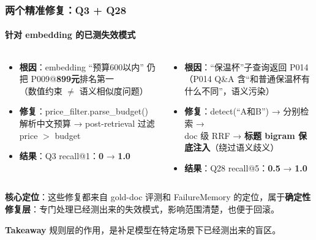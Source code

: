 \documentclass[aspectratio=169,10pt]{beamer}
\newcommand{\takeaway}[1]{%
  \vfill%
  \begin{tcolorbox}[
    colback=Ctakebg, colframe=Ctakebg,
    arc=0pt, boxrule=0pt,
    left=7pt, right=7pt, top=4pt, bottom=4pt,
    width=\textwidth, nobeforeafter
  ]%
    {\scriptsize\color{white}\textbf{Takeaway}\enspace%
     \color{white!88!Ctakebg}#1}%
  \end{tcolorbox}%
}
\newcommand{\hi}[1]{{\bfseries\color{Cgreen}#1}}      %
\newcommand{\bad}[1]{{\bfseries\color{Cred}#1}}       %
\newcommand{\mono}[1]{{\ttfamily\small\color{Cblue!90!black}#1}}  %
\begin{document}
\begin{frame}
\frametitle{两个精准修复：Q3 + Q28}
\framesubtitle{针对 embedding 的已测失效模式}

\begin{columns}[T]
\begin{tcolorbox}[tcblue, title={\color{Cblue}Q3 — 价格约束过滤}]
\small\begin{itemize}\setlength\itemsep{0.35em}
  \item \textbf{根因}：embedding ``预算600以内'' 仍把
    P009@\bad{899元}排名第一\\
    {\color{Cmuted}（数值约束 $\neq$ 语义相似度问题）}
  \item \textbf{修复}：\mono{price\_filter.parse\_budget()}\\
    解析中文预算 → post-retrieval 过滤 price $>$ budget
  \item \textbf{结果}：Q3 recall@1：\bad{0} → \hi{\textbf{1.0}}
\end{itemize}
\end{tcolorbox}

\begin{tcolorbox}[tcgreen, title={\color{Cgreen}Q28 — 复合查询分解}]
\small\begin{itemize}\setlength\itemsep{0.35em}
  \item \textbf{根因}：``保温杯''子查询返回 P014\\
    {\color{Cmuted}（P014 Q\&A 含``和普通保温杯有什么不同''，语义污染）}
  \item \textbf{修复}：detect(``A和B'') → 分别检索 →\\
    doc 级 RRF → \textbf{标题 bigram 保底注入}（绕过语义歧义）
  \item \textbf{结果}：Q28 recall@5：\bad{0.5} → \hi{\textbf{1.0}}
\end{itemize}
\end{tcolorbox}
\end{columns}

\vspace{0.22cm}
\begin{tcolorbox}[tcgray]
\small\textbf{核心定位}：这些修复都来自 gold-doc 评测和 FailureMemory 的定位，属于\textbf{确定性修复层}：专门处理已经测出来的失效模式，影响范围清楚，也便于回滚。
\end{tcolorbox}

\takeaway{规则层的作用，是补足模型在特定场景下已经测出来的盲区。}
\end{frame}
\end{document}
